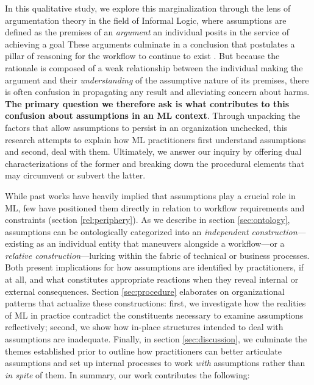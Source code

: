 In this qualitative study, we explore this marginalization through the lens of argumentation theory in the field of  Informal Logic, where assumptions are defined as the premises of an \textit{argument} an individual posits in the service of achieving a goal  
These arguments culminate in a conclusion that postulates a pillar of reasoning for the workflow to continue to exist . But because the rationale is composed of a weak relationship between the individual making the argument and their \textit{understanding} of the assumptive nature of its premises, there is often confusion in propagating any result and alleviating concern about harms. \textbf{The primary question we therefore ask is what contributes to this confusion about assumptions in an ML context}. Through unpacking the factors that allow assumptions to persist in an organization unchecked, this research attempts to explain how ML practitioners first understand assumptions and second, deal with them. Ultimately, we answer our inquiry by offering dual characterizations of the former and breaking down the procedural elements that may circumvent or subvert the latter.

While past works have heavily implied that assumptions play a crucial role in ML, few have positioned them directly in relation to workflow requirements and constraints (section \ref{rel:periphery}). As we describe in section \ref{sec:ontology}, assumptions can be ontologically categorized into an \textit{independent construction}---existing as an individual entity that maneuvers alongside a workflow---or a \textit{relative construction}---lurking within the fabric of technical or business processes. Both present implications for how assumptions are identified by practitioners, if at all, and what constitutes appropriate reactions when they reveal internal or external consequences. Section \ref{sec:procedure} elaborates on organizational patterns that actualize these constructions: first, we investigate how the realities of ML in practice contradict the constituents necessary to examine assumptions reflectively; second, we show how in-place structures intended to deal with assumptions are inadequate. Finally, in section \ref{sec:discussion}, we culminate the themes established prior to outline how practitioners can better articulate assumptions and set up internal processes to work \textit{with} assumptions rather than \textit{in spite} of them. In summary, our work contributes the following:

